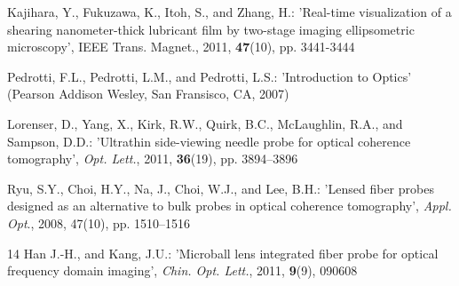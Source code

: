 \documentclass[twocolumn]{htl-author}
\begin{document}
\begin{thebibliography}{14}
Kajihara, Y., Fukuzawa, K., Itoh, S., and Zhang, H.: 'Real-time visualization of a shearing nanometer-thick lubricant film by two-stage imaging ellipsometric microscopy', IEEE Trans. Magnet., 2011, \textbf{47}(10), pp. 3441-3444


 Pedrotti, F.L., Pedrotti, L.M., and Pedrotti, L.S.: 'Introduction to Optics' (Pearson Addison Wesley, San Fransisco, CA, 2007)

 Lorenser, D., Yang, X., Kirk, R.W., Quirk, B.C., McLaughlin, R.A., and Sampson, D.D.: 'Ultrathin side-viewing needle probe for optical coherence tomography', \emph{Opt. Lett.}, 2011, \textbf{36}(19), pp. 3894--3896

 Ryu, S.Y., Choi, H.Y., Na, J., Choi, W.J., and Lee, B.H.: 'Lensed fiber probes designed as an alternative to bulk probes in optical coherence tomography', \emph{Appl. Opt}., 2008, 47(10), pp. 1510--1516

 14  Han J.-H., and Kang, J.U.: 'Microball lens integrated fiber probe for optical frequency domain imaging', \emph{Chin. Opt. Lett.}, 2011, \textbf{9}(9), 090608

\end{thebibliography}
\end{document}
